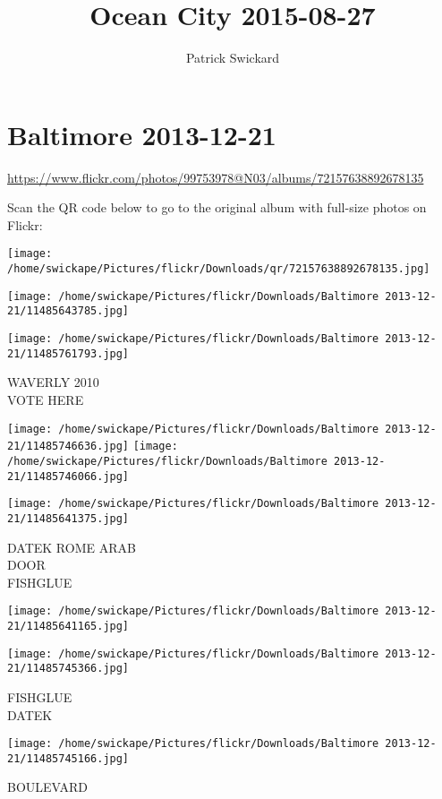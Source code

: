 \documentclass[10pt,letterpaper]{article}
\title{Ocean City 2015-08-27}
\author{Patrick Swickard}
\date{}
\begin{document}
\section*{Baltimore 2013-12-21}

\url{https://www.flickr.com/photos/99753978@N03/albums/72157638892678135}

Scan the QR code below to go to the original album with full-size photos on Flickr:

\texttt{[image: /home/swickape/Pictures/flickr/Downloads/qr/72157638892678135.jpg]}
\pagebreak

\texttt{[image: /home/swickape/Pictures/flickr/Downloads/Baltimore 2013-12-21/11485643785.jpg]}

\vspace{0.25in}
\texttt{[image: /home/swickape/Pictures/flickr/Downloads/Baltimore 2013-12-21/11485761793.jpg]}

WAVERLY 2010\\
VOTE HERE
\pagebreak

\texttt{[image: /home/swickape/Pictures/flickr/Downloads/Baltimore 2013-12-21/11485746636.jpg]}
\texttt{[image: /home/swickape/Pictures/flickr/Downloads/Baltimore 2013-12-21/11485746066.jpg]}

\texttt{[image: /home/swickape/Pictures/flickr/Downloads/Baltimore 2013-12-21/11485641375.jpg]}

DATEK ROME ARAB\\
DOOR\\
FISHGLUE
\pagebreak

\texttt{[image: /home/swickape/Pictures/flickr/Downloads/Baltimore 2013-12-21/11485641165.jpg]}

\vspace{0.25in}
\texttt{[image: /home/swickape/Pictures/flickr/Downloads/Baltimore 2013-12-21/11485745366.jpg]}

FISHGLUE\\
DATEK
\pagebreak

\texttt{[image: /home/swickape/Pictures/flickr/Downloads/Baltimore 2013-12-21/11485745166.jpg]}

BOULEVARD
\pagebreak
\end{document}
